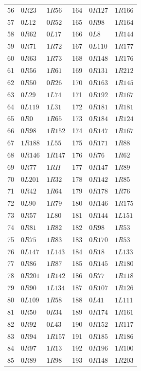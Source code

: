 \begin{longtable}{rll@{\qquad}rll}
56 & $0R23$ & $1R56$ & 164 & $0R127$ & $1R166$\\
57 & $0L12$ & $0R52$ & 165 & $0R98$ & $1R164$\\
58 & $0R62$ & $0L17$ & 166 & $0L8$ & $1R144$\\
59 & $0R71$ & $1R72$ & 167 & $0L110$ & $1R177$\\
60 & $0R63$ & $1R73$ & 168 & $0R148$ & $1R176$\\
61 & $0R56$ & $1R61$ & 169 & $0R131$ & $1R212$\\
62 & $0R50$ & $0R26$ & 170 & $0R163$ & $1R145$\\
63 & $0L29$ & $1L74$ & 171 & $0R192$ & $1R167$\\
64 & $0L119$ & $1L31$ & 172 & $0R181$ & $1R181$\\
65 & $0R0$ & $1R65$ & 173 & $0R184$ & $1R124$\\
66 & $0R98$ & $1R152$ & 174 & $0R147$ & $1R167$\\
67 & $1R188$ & $1L55$ & 175 & $0R171$ & $1R88$\\
68 & $0R146$ & $1R147$ & 176 & $0R76$ & $1R62$\\
69 & $0R77$ & $1RH$ & 177 & $0R147$ & $1R89$\\
70 & $0L201$ & $1R32$ & 178 & $0R142$ & $1R85$\\
71 & $0R42$ & $1R64$ & 179 & $0R178$ & $1R76$\\
72 & $0L90$ & $1R79$ & 180 & $0R146$ & $1R175$\\
73 & $0R57$ & $1L80$ & 181 & $0R144$ & $1L151$\\
74 & $0R81$ & $1R82$ & 182 & $0R98$ & $1R53$\\
75 & $0R75$ & $1R83$ & 183 & $0R170$ & $1R53$\\
76 & $0L147$ & $1L143$ & 184 & $0R18$ & $1L133$\\
77 & $0R86$ & $1R87$ & 185 & $0R145$ & $1R180$\\
78 & $0R201$ & $1R142$ & 186 & $0R77$ & $1R118$\\
79 & $0R90$ & $1L134$ & 187 & $0R107$ & $1R126$\\
80 & $0L109$ & $1R58$ & 188 & $0L41$ & $1L111$\\
81 & $0R50$ & $0R34$ & 189 & $0R174$ & $1R161$\\
82 & $0R92$ & $0L43$ & 190 & $0R152$ & $1R117$\\
83 & $0R94$ & $1R157$ & 191 & $0R185$ & $1R186$\\
84 & $0R97$ & $1R13$ & 192 & $0R196$ & $1R100$\\
85 & $0R89$ & $1R98$ & 193 & $0R148$ & $1R203$\\

\end{longtable}
